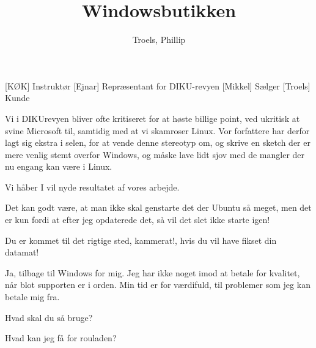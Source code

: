 \documentclass[a4paper,11pt]{article}
\title{Windowsbutikken}
\author{Troels, Phillip}
\begin{document}
\maketitle
\begin{roles}
 [KØK] Instruktør
  [Ejnar] Repræsentant for DIKU-revyen
  [Mikkel] Sælger
  [Troels] Kunde
\end{roles}
\begin{props}
\end{props}
\begin{sketch}

 Vi i DIKUrevyen bliver ofte kritiseret for at høste billige point, ved
ukritisk at svine Microsoft til, samtidig med at vi skamroser Linux. Vor
forfattere har derfor lagt sig ekstra i selen, for at vende denne stereotyp
om, og skrive en sketch der er mere venlig stemt overfor Windows, og måske
lave lidt sjov med de mangler der nu engang kan være i Linux.

 Vi håber I vil nyde resultatet af vores arbejde.



 Det kan godt være, at man ikke skal genstarte det der Ubuntu så meget,
men det er kun fordi at efter jeg opdaterede det, så vil det slet ikke
starte igen!

 Du er kommet til det rigtige sted, kammerat!, hvis du vil have fikset
din datamat! 

  Ja, tilbage til Windows for
mig. Jeg har ikke noget imod at betale for kvalitet, når blot
supporten er i orden. Min tid er for værdifuld, til problemer som jeg
kan betale mig fra.

 Hvad skal du så bruge?

 Hvad kan jeg få for rouladen?


\end{sketch}
\end{document}
